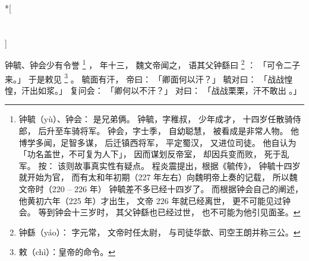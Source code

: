 
\switchcolumn[0]*[\section{}]

钟毓、钟会少有令誉%
\footnote{%
    钟毓（yù）、钟会：
        是兄弟俩。
        钟毓，字稚叔，
        少年成才，
        十四岁任散骑侍郎，
        后升至车骑将军。
        钟会，字士季，
        自幼聪慧，
        被看成是非常人物。
        他博学多闻，足智多谋，
        后迁镇西将军，
        平定蜀汉，
        又进位司徒。
        他自认为
        「功名盖世，不可复为人下」，
        因而谋划反帝室，
        却因兵变而败，
        死于乱军。
    按：
        该则故事真实性有疑点。
        程炎震提出，根据《毓传》，
        钟毓十四岁就开始为官，
        而有太和年初期（227 年左右）向魏明帝上奏的记载，
        所以魏文帝时（220 -- 226 年）
        钟毓差不多已经十四岁了。
        而根据钟会自己的阐述，
        他黄初六年（225 年）才出生，
        文帝 226 年就已经离世，
        更不可能见过钟会。
        等到钟会十三岁时，
        其父钟繇也已经过世，
        也不可能为他引见面圣。
}%
，
年十三，
魏文帝闻之，
语其父钟繇曰%
\footnote{%
    钟繇（yáo）：
        字元常，
        文帝时任太尉，
        与司徒华歆、司空王朗并称三公。
}%
：
「可令二子来。」
于是敕见%
\footnote{%
    敕（chì）：皇帝的命令。
}%
。
毓面有汗，
帝曰：
「卿面何以汗？」
毓对曰：
「战战惶惶，汗出如浆。」
复问会：
「卿何以不汗？」
对曰：
「战战栗栗，汗不敢出 。」

\switchcolumn


